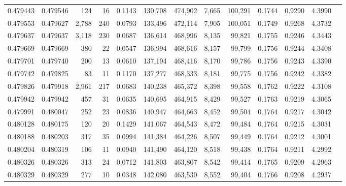 \begin{tabular}{rrrrrrrrrrrrr}
0.479443 & 0.479546 &   124 &    16 &                                     0.1143 & 130,708 & 474,902 &   7,665 & 100,291 & 0.1744 & 0.9290 & 4.3990 \\
0.479553 & 0.479627 & 2,788 &   240 &                                     0.0793 & 133,496 & 472,114 &   7,905 & 100,051 & 0.1749 & 0.9268 & 4.3732 \\
0.479637 & 0.479637 & 3,118 &   230 &                                     0.0687 & 136,614 & 468,996 &   8,135 &  99,821 & 0.1755 & 0.9246 & 4.3443 \\
0.479669 & 0.479669 &   380 &    22 &                                     0.0547 & 136,994 & 468,616 &   8,157 &  99,799 & 0.1756 & 0.9244 & 4.3408 \\
0.479701 & 0.479740 &   200 &    13 &                                     0.0610 & 137,194 & 468,416 &   8,170 &  99,786 & 0.1756 & 0.9243 & 4.3390 \\
0.479742 & 0.479825 &    83 &    11 &                                     0.1170 & 137,277 & 468,333 &   8,181 &  99,775 & 0.1756 & 0.9242 & 4.3382 \\
0.479826 & 0.479918 & 2,961 &   217 &                                     0.0683 & 140,238 & 465,372 &   8,398 &  99,558 & 0.1762 & 0.9222 & 4.3108 \\
0.479942 & 0.479942 &   457 &    31 &                                     0.0635 & 140,695 & 464,915 &   8,429 &  99,527 & 0.1763 & 0.9219 & 4.3065 \\
0.479991 & 0.480047 &   252 &    23 &                                     0.0836 & 140,947 & 464,663 &   8,452 &  99,504 & 0.1764 & 0.9217 & 4.3042 \\
0.480128 & 0.480175 &   120 &    20 &                                     0.1429 & 141,067 & 464,543 &   8,472 &  99,484 & 0.1764 & 0.9215 & 4.3031 \\
0.480188 & 0.480203 &   317 &    35 &                                     0.0994 & 141,384 & 464,226 &   8,507 &  99,449 & 0.1764 & 0.9212 & 4.3001 \\
0.480204 & 0.480319 &   106 &    11 &                                     0.0940 & 141,490 & 464,120 &   8,518 &  99,438 & 0.1764 & 0.9211 & 4.2992 \\
0.480326 & 0.480326 &   313 &    24 &                                     0.0712 & 141,803 & 463,807 &   8,542 &  99,414 & 0.1765 & 0.9209 & 4.2963 \\
0.480329 & 0.480329 &   277 &    10 &                                     0.0348 & 142,080 & 463,530 &   8,552 &  99,404 & 0.1766 & 0.9208 & 4.2937 \\

\end{tabular}
